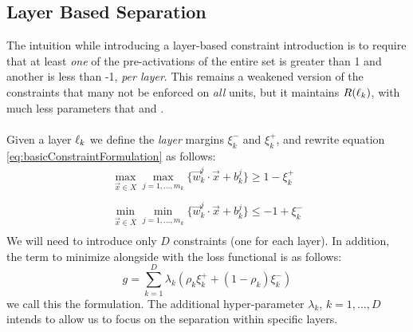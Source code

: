 \subsection{Layer Based Separation \SepLayer}\label{subsec:sepLayer}
The intuition while introducing a layer-based constraint introduction is to require that at least \emph{one} of the pre-activations of the entire set is greater than 1 and another is less than -1, \emph{per layer}. This remains a weakened version of the constraints that many not be enforced on \emph{all} units, but it maintains $R(\ell_k)$, with much less parameters that \SepUnit and \SepPoint. 
\\\\
Given a layer $\ell_k$ we define the \emph{layer} margins $\xi^{-}_k$ and $\xi^{+}_k$, and rewrite equation \ref{eq:basicConstraintFormulation} as follows:
\begin{equation}\label{eq:layerSeparationConstraint}
\begin{array}{lcl}
    \displaystyle\max_{\vec{x}\in{X}}\max_{j=1,\ldots,m_k}\{\vec{w}^j_k\cdot\vec{x}+b^j_k\}\geq 1-\xi^{+}_k\\\\
    \displaystyle\min_{\vec{x}\in{X}}\min_{j=1,\ldots,m_k}\{\vec{w}^j_k\cdot\vec{x}+b^j_k\}\leq -1+\xi^{-}_k\\
\end{array}    
\end{equation}
We will need to introduce only $D$ constraints (one for each layer). In addition, the term to minimize alongside with the loss functional is as follows:
\begin{equation}\label{eq:constraintLossForLayerSeparation}
    g = \sum_{k=1}^{D}\lambda_k(\rho_{k}\xi^{+}_{k}+(1-\rho_{k})\xi^{-}_{k})
\end{equation}
we call this the \SepLayer formulation. The additional hyper-parameter  $\lambda_k$, $k=1,\ldots,D$ intends to allow us to focus on the separation within specific layers.
